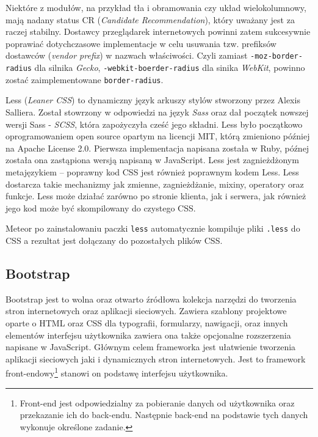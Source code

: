 Niektóre z modułów, na przykład tła i obramowania czy układ wielokolumnowy, mają nadany status CR (\textit{Candidate Recommendation}), który uważany jest za raczej stabilny. Dostawcy przeglądarek internetowych powinni zatem sukcesywnie poprawiać dotychczasowe implementacje w celu usuwania tzw. prefiksów dostawców (\textit{vendor prefix}) w nazwach właściwości. Czyli zamiast \verb|-moz-border-radius| dla silnika \emph{Gecko}, \verb|-webkit-boerder-radius| dla sinika \emph{WebKit}, powinno zostać zaimplementowane \verb|border-radius|.

Less (\emph{Leaner CSS}) to dynamiczny język arkuszy stylów stworzony przez Alexis Salliera. Został stowrzony w odpowiedzi na język \emph{Sass} oraz dał początek nowszej wersji Sass - \emph{SCSS}, która zapożyczyła cześć jego składni. Less było początkowo oprogramowaniem open source opartym na licencji MIT, którą zmieniono później na Apache License 2.0. Pierwsza implementacja napisana została w Ruby, późnej została ona zastąpiona wersją napisaną w JavaScript. Less jest zagnieżdżonym metajęzykiem -- poprawny kod CSS jest również poprawnym kodem Less. Less dostarcza takie mechanizmy jak zmienne, zagnieżdżanie, mixiny, operatory oraz funkcje. Less może działać zarówno po stronie klienta, jak i serwera, jak również jego kod może być skompilowany do czystego CSS. 

Meteor po zainstalowaniu paczki \verb|less| automatycznie kompiluje pliki \verb|.less| do CSS a rezultat jest dołączany do pozostałych plików CSS.

\subsection{Bootstrap}

Bootstrap jest to wolna oraz otwarto źródłowa kolekcja narzędzi do tworzenia stron internetowych oraz aplikacji sieciowych. Zawiera szablony projektowe oparte o HTML oraz CSS dla typografii, formularzy, nawigacji, oraz innych elementów interfejsu użytkownika zawiera ona także opcjonalne rozszerzenia napisane w JavaScript. Głównym celem frameworka jest ułatwienie tworzenia aplikacji sieciowych jaki i  dynamicznych stron internetowych. Jest to framework front-endowy\footnote{Front-end jest odpowiedzialny za pobieranie danych od użytkownika oraz przekazanie ich do back-endu. Następnie back-end na podstawie tych danych wykonuje określone zadanie.} stanowi on podstawę interfejsu użytkownika\cite{bsWiki}.

